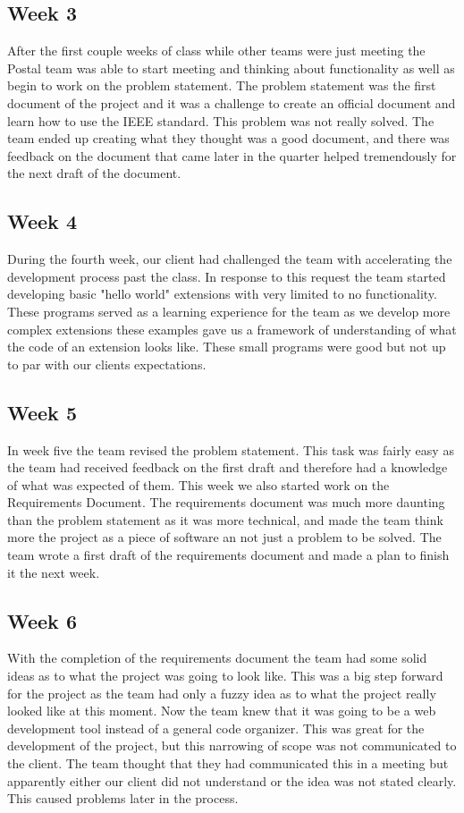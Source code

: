 \documentclass[letterpaper,10pt,titlepage,draftclsnofoot,onecolumn,onesided] {IEEEtran}
\begin{document}
	\subsection{Week 3}
	After the first couple weeks of class while other teams were just meeting the Postal team was able to start meeting and thinking about functionality as well as begin to work on the problem statement.
	The problem statement was the first document of the project and it was a challenge to create an official document and learn how to use the IEEE standard. 
	This problem was not really solved.
	The team ended up creating what they thought was a good document, and there was feedback on the document that came later in the quarter helped tremendously for the next draft of the document.
	
	\subsection{Week 4}
	During the fourth week, our client had challenged the team with accelerating the development process past the class.
	In response to this request the team started developing basic "hello world" extensions with very limited to no functionality.
	These programs served as a learning experience for the team as we develop more complex extensions these examples gave us a framework of understanding of what the code of an extension looks like.
	These small programs were good but not up to par with our clients expectations.	
	
	\subsection{Week 5}
	In week five the team revised the problem statement.
	This task was fairly easy as the team had received feedback on the first draft and therefore had a knowledge of what was expected of them.
	This week we also started work on the Requirements Document. 
	The requirements document was much more daunting than the problem statement as it was more technical, and made the team think more the project as a piece of software an not just a problem to be solved.
	The team wrote a first draft of the requirements document and made a plan to finish it the next week.
	
	\subsection{Week 6}
	With the completion of the requirements document the team had some solid ideas as to what the project was going to look like.
	This was a big step forward for the project as the team had only a fuzzy idea as to what the project really looked like at this moment.
	Now the team knew that it was going to be a web development tool instead of a general code organizer.
	This was great for the development of the project, but this narrowing of scope was not communicated to the client. 
	The team thought that they had communicated this in a meeting but apparently either our client did not understand or the idea was not stated clearly.
	This caused problems later in the process.
	
\end{document}
